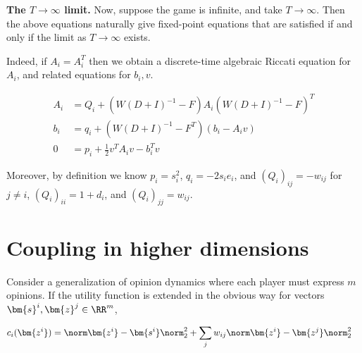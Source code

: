 {\bf The $T \to \infty$ limit.} Now, suppose the game is infinite, and take $T \to \infty$. Then the above equations naturally give fixed-point equations that are satisfied if and only if the limit as $T \to \infty$ exists. 

Indeed, if $A_i = A_i^T$ then we obtain a discrete-time algebraic Riccati equation for $A_i$, and related equations for $b_i, v$. 

\begin{align*}
A_i &= Q_i + (W (D+I)^{-1} - F) A_i(W (D+I)^{-1} - F)^T \\
b_i &= q_i + (W (D+I)^{-1} - F^T) (b_i - A_i v) \\
0 &= p_i + \frac 1 2 v^T A_i v - b_i^T v 
\end{align*}

Moreover, by definition we know $p_i = s_i^2$, $q_i = -2s_i e_i$, and $(Q_i)_{ij} = -w_{ij}$ for $j \neq i$, $(Q_i)_{ii} = 1 + d_i$, and $(Q_i)_{jj} = w_{ij}$. 






\section{Coupling in higher dimensions}

Consider a generalization of opinion dynamics where each player must express $m$ opinions. If the utility function is extended in the obvious way for vectors $\bm{s}^i, \bm{z}^j \in \RR^m$, 

\begin{align*}
c_i(\bm{z^i}) &= \norm \bm{z^i} - \bm{s^i} \norm_2^2
+ \sum_j w_{ij} \norm \bm{z^i} - \bm{z^j} \norm_2^2
\end{align*}


